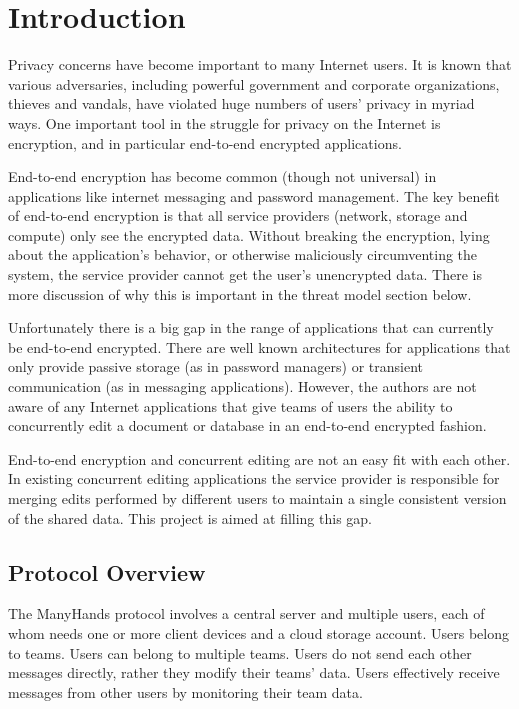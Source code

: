 \documentclass[pldi,10pt,preprint]{sigplanconf-pldi16}
\begin{document}
\section{Introduction}

Privacy concerns have become important to many Internet users.
It is known that various adversaries, including powerful government and corporate organizations, thieves and vandals, have violated huge numbers of users' privacy in myriad ways.
One important tool in the struggle for privacy on the Internet is encryption, and in particular end-to-end encrypted applications.

End-to-end encryption has become common (though not universal) in applications like internet messaging and password management.
The key benefit of end-to-end encryption is that all service providers (network, storage and compute) only see the encrypted data.
Without breaking the encryption, lying about the application's behavior, or otherwise maliciously circumventing the system, the service provider cannot get the user's unencrypted data.
There is more discussion of why this is important in the threat model section below.

Unfortunately there is a big gap in the range of applications that can currently be end-to-end encrypted.
There are well known architectures for applications that only provide passive storage (as in password managers) or transient communication (as in messaging applications).
However, the authors are not aware of any Internet applications that give teams of users the ability to concurrently edit a document or database in an end-to-end encrypted fashion.

End-to-end encryption and concurrent editing are not an easy fit with each other.
In existing concurrent editing applications the service provider is responsible for merging edits performed by different users to maintain a single consistent version of the shared data.
This project is aimed at filling this gap.

\subsection{Protocol Overview}

The ManyHands protocol involves a central server and multiple users, each of whom needs one or more client devices and a cloud storage account.
Users belong to teams.
Users can belong to multiple teams.
Users do not send each other messages directly, rather they modify their teams' data.
Users effectively receive messages from other users by monitoring their team data.
\end{document}
